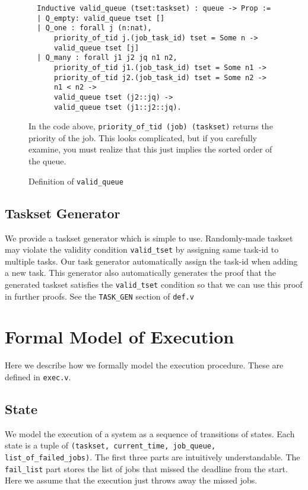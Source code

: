 \documentclass[nocopyrightspace]{sigplanconf}
\begin{document}
\begin{figure}[H]
\begin{verbatim}
  Inductive valid_queue (tset:taskset) : queue -> Prop :=
  | Q_empty: valid_queue tset []
  | Q_one : forall j (n:nat),
      priority_of_tid j.(job_task_id) tset = Some n ->
      valid_queue tset [j]
  | Q_many : forall j1 j2 jq n1 n2,
      priority_of_tid j1.(job_task_id) tset = Some n1 ->
      priority_of_tid j2.(job_task_id) tset = Some n2 ->
      n1 < n2 ->
      valid_queue tset (j2::jq) ->
      valid_queue tset (j1::j2::jq).
\end{verbatim}
\caption{ Definition of \texttt{valid\_queue} }\label{fig:valid_queue}

In the code above, \texttt{priority\_of\_tid (job) (taskset)} returns the priority of the job.
This looks complicated, but if you carefully examine, you must realize that this just implies the sorted order of the queue.

\end{figure}

\subsection{Taskset Generator}
We provide a taskset generator which is simple to use. Randomly-made taskset may violate the validity condition \texttt{valid\_tset} by assigning same task-id to multiple tasks. Our task generator automatically assign the task-id when adding a new task. This generator also automatically generates the proof that the generated taskset satisfies the \texttt{valid\_tset} condition so that we can use this proof in further proofs. See the \texttt{TASK\_GEN} section of \texttt{def.v}


\section{Formal Model of Execution}

Here we describe how we formally model the execution procedure. These are defined in \texttt{exec.v}.

\subsection{State}

We model the execution of a system as a sequence of transitions of states. Each state is a tuple of
\texttt{(taskset, current\_time, job\_queue, list\_of\_failed\_jobs)}. The first three parts are intuitively
understandable. The \texttt{fail\_list} part stores the list of jobs that missed the deadline from the start.
Here we assume that the execution just throws away the missed jobs.
\end{document}

